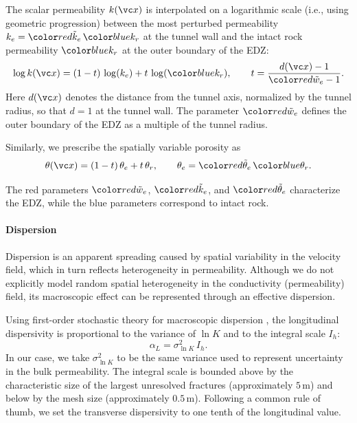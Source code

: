 The scalar permeability $k(\vc x)$ is interpolated on a logarithmic scale (i.e., using geometric progression) between the most perturbed permeability $k_e=\edzPerm\,\iPerm$ at the tunnel wall and the intact rock permeability $\iPerm$ at the outer boundary of the EDZ:
\begin{equation}
    \label{eq:edz_perm}
    \log k(\vc x) = (1-t)\,\log(k_e) + t\,\log(\iPerm),
    \qquad
    t=\frac{d(\vc x)-1}{\edzRelThick-1}.
\end{equation}
Here $d(\vc x)$ denotes the distance from the tunnel axis, normalized by the tunnel radius, so that $d=1$ at the tunnel wall. The parameter $\edzRelThick$ defines the outer boundary of the EDZ as a multiple of the tunnel radius.

Similarly, we prescribe the spatially variable porosity as
\begin{equation}
    \label{eq:edz_por}
    \theta(\vc x) = (1-t)\,\theta_e + t\,\theta_r,
    \qquad
    \theta_e = \edzPor\,\iPor.
\end{equation}

The red parameters $\edzRelThick$, $\edzPerm$, and $\edzPor$ characterize the EDZ, while the blue parameters correspond to intact rock.

\paragraph{Dispersion}
Dispersion is an apparent spreading caused by spatial variability in the velocity field, which in turn reflects heterogeneity in permeability. Although we do not explicitly model random spatial heterogeneity in the conductivity (permeability) field, its macroscopic effect can be represented through an effective dispersion.

Using first-order stochastic theory for macroscopic dispersion \cite{Zech_Evidence_2023}, the longitudinal dispersivity is proportional to the variance of $\ln K$ and to the integral scale $I_h$:
\begin{equation}
    \alpha_L = \sigma_{\ln K}^2\, I_h .
\end{equation}
In our case, we take $\sigma_{\ln K}^2$ to be the same variance used to represent uncertainty in the bulk permeability. The integral scale is bounded above by the characteristic size of the largest unresolved fractures (approximately $5\,\mathrm{m}$) and below by the mesh size (approximately $0.5\,\mathrm{m}$). Following a common rule of thumb, we set the transverse dispersivity to one tenth of the longitudinal value.

